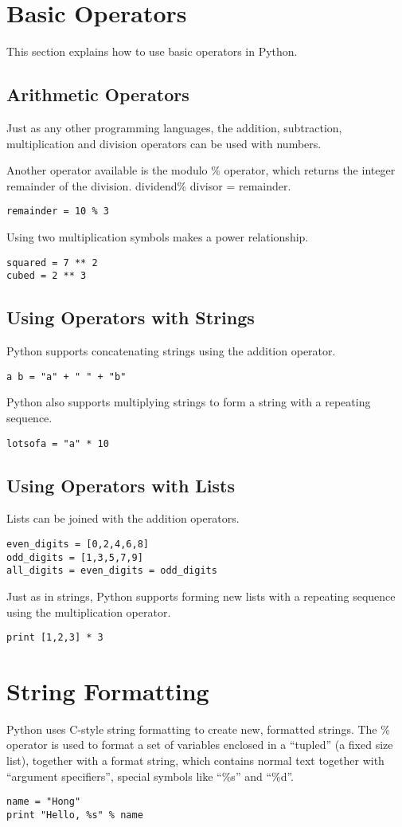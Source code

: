 \documentclass[a4paper,oneside]{book}
\numberwithin{equation}{chapter}
\begin{document}
\section{Basic Operators}
This section explains how to use basic operators in Python.
\subsection{Arithmetic Operators}
Just as any other programming languages, the addition, subtraction, multiplication and division operators can be used with numbers.

Another operator available is the modulo \% operator, which returns the integer remainder of the division. dividend\% divisor = remainder.
\begin{verbatim}
remainder = 10 % 3
\end{verbatim}

Using two multiplication symbols makes a power relationship.
\begin{verbatim}
squared = 7 ** 2
cubed = 2 ** 3 
\end{verbatim}
\subsection{Using Operators with Strings}
Python supports concatenating strings using the addition operator.
\begin{verbatim}
a b = "a" + " " + "b"
\end{verbatim}

Python also supports multiplying strings to form a string with a repeating sequence.
\begin{verbatim}
lotsofa = "a" * 10
\end{verbatim}
\subsection{Using Operators with Lists}
Lists can be joined with the addition operators.
\begin{verbatim}
even_digits = [0,2,4,6,8]
odd_digits = [1,3,5,7,9]
all_digits = even_digits = odd_digits
\end{verbatim}

Just as in strings, Python supports forming new lists with a repeating sequence using the multiplication operator.
\begin{verbatim}
print [1,2,3] * 3
\end{verbatim}
\section{String Formatting}
Python uses C-style string formatting to create new, formatted strings. The \% operator is used to format a set of variables enclosed in a ``tupled'' (a fixed size list), together with a format string, which contains normal text together with ``argument specifiers'', special symbols like ``\%s'' and ``\%d''.
\begin{verbatim}
name = "Hong"
print "Hello, %s" % name
\end{verbatim}
\end{document}
